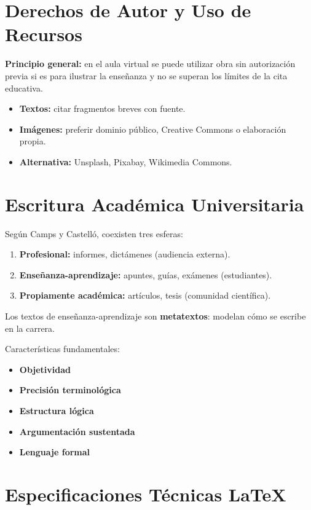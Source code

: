 \documentclass[12pt,a4paper]{article}
\begin{document}
\section{Derechos de Autor y Uso de Recursos}

\textbf{Principio general:} en el aula virtual se puede utilizar obra sin autorización previa si es para ilustrar la enseñanza y no se superan los límites de la cita educativa.

\begin{itemize}
    \item \textbf{Textos:} citar fragmentos breves con fuente.
    \item \textbf{Imágenes:} preferir dominio público, Creative Commons o elaboración propia.
    \item \textbf{Alternativa:} Unsplash, Pixabay, Wikimedia Commons.
\end{itemize}

\section{Escritura Académica Universitaria}

Según Camps y Castelló, coexisten tres esferas:
\begin{enumerate}
    \item \textbf{Profesional:} informes, dictámenes (audiencia externa).
    \item \textbf{Enseñanza-aprendizaje:} apuntes, guías, exámenes (estudiantes).
    \item \textbf{Propiamente académica:} artículos, tesis (comunidad científica).
\end{enumerate}

Los textos de enseñanza-aprendizaje son \textbf{metatextos}: modelan cómo se escribe en la carrera.

Características fundamentales:
\begin{itemize}
    \item \textbf{Objetividad}
    \item \textbf{Precisión terminológica}
    \item \textbf{Estructura lógica}
    \item \textbf{Argumentación sustentada}
    \item \textbf{Lenguaje formal}
\end{itemize}

\section{Especificaciones Técnicas LaTeX}
\end{document}
